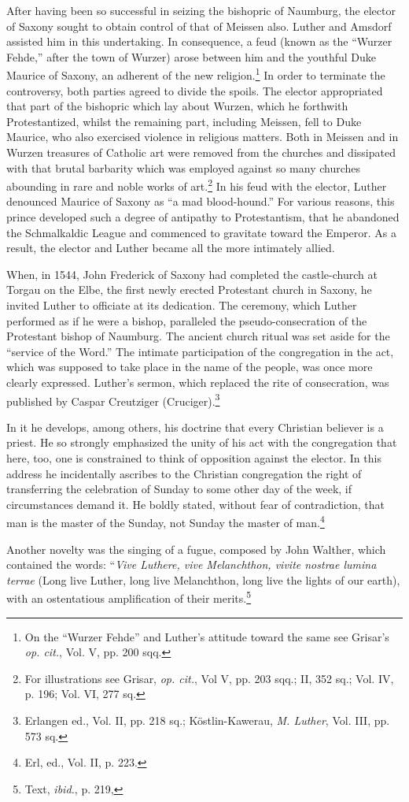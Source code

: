 After having been so successful in seizing the bishopric of Naumburg,
the elector of Saxony sought to obtain control of that of
Meissen also. Luther and Amsdorf assisted him in this undertaking.
In consequence, a feud (known as the “Wurzer Fehde,” after the
town of Wurzer) arose between him and the youthful Duke Maurice
of Saxony, an adherent of the new religion.\footnote
{On the “Wurzer Fehde” and Luther’s attitude toward the same see Grisar’s \textit{op. cit.},
Vol. V, pp. 200 sqq.}
In order to terminate
the controversy, both parties agreed to divide the spoils. The elector
appropriated that part of the bishopric which lay about Wurzen,
which he forthwith Protestantized, whilst the remaining part, including
Meissen, fell to Duke Maurice, who also exercised violence in religious
matters. Both in Meissen and in Wurzen treasures of Catholic
art were removed from the churches and dissipated with that brutal
barbarity which was employed against so many churches abounding
in rare and noble works of art.\footnote
{For illustrations see Grisar, \textit{op. cit.}, Vol V, pp. 203 sqq.; II, 352 sq.; Vol. IV, p.
196; Vol. VI, 277 sq.}
In his feud with the elector, Luther
denounced Maurice of Saxony as ``a mad blood-hound.'' For various
reasons, this prince developed such a degree of antipathy to Protestantism,
that he abandoned the Schmalkaldic League and commenced
to gravitate toward the Emperor. As a result, the elector and Luther
became all the more intimately allied.

When, in 1544, John Frederick of Saxony had completed the
castle-church at Torgau on the Elbe, the first newly erected
Protestant church in Saxony, he invited Luther to officiate at its dedication.
The ceremony, which Luther performed as if he were a bishop, paralleled
the pseudo-consecration of the Protestant bishop of Naumburg.
The ancient church ritual was set aside for the “service of the Word.”
The intimate participation of the congregation in the act, which
was supposed to take place in the name of the people, was once
more clearly expressed. Luther’s sermon, which replaced the rite of
consecration, was published by Caspar Creutziger (Cruciger).\footnote
{Erlangen ed., Vol. II, pp. 218 sq.; Köstlin-Kawerau, \textit{M. Luther}, Vol. III, pp. 573 sq.}

In it he develops, among others, his doctrine that every Christian believer
is a priest. He so strongly emphasized the unity of his act with
the congregation that here, too, one is constrained to think of opposition
against the elector. In this address he incidentally ascribes
to the Christian congregation the right of transferring the celebration
of Sunday to some other day of the week, if circumstances
demand it. He boldly stated, without fear of contradiction, that
man is the master of the Sunday, not Sunday the master of man.\footnote{Erl, ed., Vol. II, p. 223.}

Another novelty was the singing of a fugue, composed by John Walther,
which contained the words: “\textit{Vive Luthere, vive Melanchthon, vivite
nostrae lumina terrae} (Long live Luther, long live Melanchthon, long
live the lights of our earth), with an ostentatious amplification of
their merits.\footnote{Text, \textit{ibid.}, p. 219,}
